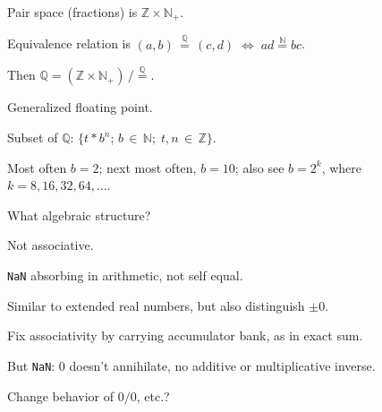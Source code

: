 Pair space (fractions) is $\mathbb{Z} \times \mathbb{N}_{+}$.

Equivalence relation is 
$(a,b) \, \overset{\mathbb{Q}}{=} \, (c,d) 
\; \Leftrightarrow \; 
ad \overset{\mathbb{N}}{=} bc$.

Then 
$\mathbb{Q} = 
(\mathbb{Z} \times \mathbb{N}_{+}) 
\, / 
\overset{\mathbb{Q}}{=}$.

\label{Sec:b_adic_numbers}

Generalized floating point.

Subset of $\mathbb{Q}$:
$\{t \ast b^n$; $b\,\in\,\mathbb{N};\; t,n\,\in\,\mathbb{Z}\}$.

Most often $b=2$; 
next most often, $b=10$;
also see $b=2^k$, where $k=8,16,32,64,\ldots$.


What algebraic structure?

Not associative.

\texttt{NaN} absorbing in arithmetic, not self equal.

Similar to extended real numbers, but also distinguish $\pm 0$.




Fix associativity by carrying accumulator bank,
as in exact sum.

But \texttt{NaN}: $0$ doesn't annihilate,
no additive or multiplicative inverse.

Change behavior of $0 / 0$, etc.?


